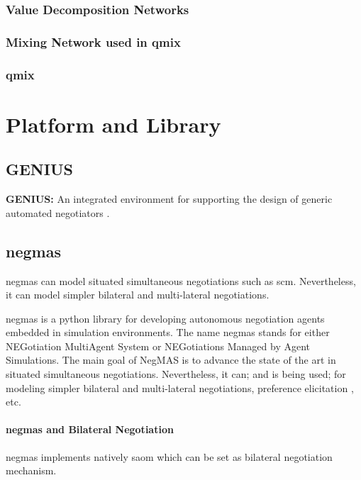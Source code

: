 \subsubsection{Value Decomposition Networks}

\subsubsection{Mixing Network used in \gls{qmix}}

\subsubsection{\gls{qmix}}

\section{Platform and Library}
\subsection{GENIUS}
\textbf{GENIUS:} An integrated environment for supporting the design of generic automated negotiators \parencite{Lin2014}.

\subsection{\gls{negmas}} \label{background:negmas}
\gls{negmas} can model situated simultaneous negotiations such as \gls{scm}. Nevertheless, it can model simpler bilateral and multi-lateral negotiations.

\gls{negmas} is a python library for developing autonomous negotiation agents embedded in simulation environments. The name negmas stands for either NEGotiation MultiAgent System or NEGotiations Managed by Agent Simulations. The main goal of NegMAS is to advance the state of the art in situated simultaneous negotiations. Nevertheless, it can; and is being used; for modeling simpler bilateral and multi-lateral negotiations, preference elicitation , etc.

\paragraph{\gls{negmas} and Bilateral Negotiation}
\gls{negmas} implements natively \gls{saom} which can be set as bilateral negotiation mechanism.

